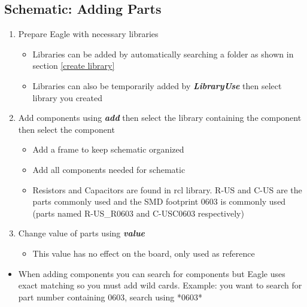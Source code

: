 \documentclass{article}
\begin{document}
\subsection{Schematic: Adding Parts}
\begin{enumerate}
    \item Prepare Eagle with necessary libraries
    \begin{itemize}
        \item Libraries can be added by automatically searching a folder as shown in section \ref{create library}
        \item Libraries can also be temporarily added by \textit{\textbf{Library\textrightarrow Use}} then select library you created
    \end{itemize}
    \item Add components using \textit{\textbf{add}} then select the library containing the component then select the component
    \begin{itemize}
        \item Add a frame to keep schematic organized
        \item Add all components needed for schematic
        \item Resistors and Capacitors are found in rcl library. R-US and C-US are the parts commonly used and the SMD footprint 0603 is commonly used (parts named R-US\_R0603 and C-USC0603 respectively)
    \end{itemize}
    \item Change value of parts using \textit{\textbf{value}}
    \begin{itemize}
        \item This value has no effect on the board, only used as reference
    \end{itemize}
\end{enumerate}
\begin{tcolorbox} [title=Tips \& Tricks]
    \begin{itemize}
        \item When adding components you can search for components but Eagle uses exact matching so you must add wild cards. Example: you want to search for part number containing 0603, search using *0603*
    \end{itemize}
\end{tcolorbox}
\end{document}
